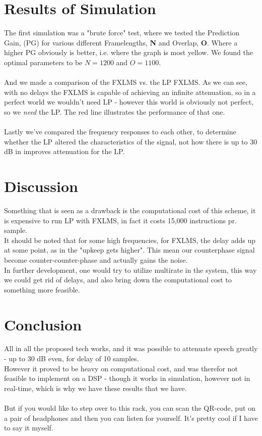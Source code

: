 \documentclass[12pt,a4paper,openright]{article}
\begin{document}
\section{Results of Simulation}
The first simulation was a "brute force" test, where we tested the Prediction Gain, (PG) for various different Framelengths, \textbf{N} and Overlap, \textbf{O}. Where a higher PG obviously is better, i.e. where the graph is most yellow.
We found the optimal parameters to be $N=1200$ and $O=1100$.\\\\
And we made a comparison of the FXLMS vs. the LP FXLMS. As we can see, with no delays the FXLMS is capable of achieving an infinite attenuation, so in a perfect world we wouldn't need LP - however this world is obviously not perfect, so we \textit{need} the LP. The red line illustrates the performance of that one.\\\\
Lastly we've compared the frequency responses to each other, to determine whether the LP altered the characteristics of the signal, not how there is up to 30 dB in improves attenuation for the LP.\\

\section{Discussion}
Something that is seen as a drawback is the computational cost of this scheme, it is expensive to run LP with FXLMS, in fact it costs 15,000 instructions pr. sample.\\ 
It should be noted that for some high frequencies, for FXLMS, the delay adds up at some point, as in the "upkeep gets higher". This mean our counterphase signal become counter-counter-phase and actually gains the noise. \\

In further development, one would try to utilize multirate in the system, this way we could get rid of delays, and also bring down the computational cost to something more feasible.


\section{Conclusion}
All in all the proposed tech works, and it was possible to attenuate speech greatly - up to 30 dB even, for delay of 10 samples.\\
However it proved to be heavy on computational cost, and was therefor not feasible to implement on a DSP - though it works in simulation, however not in real-time, which is why we have these results that we have.\\\\

But if you would like to step over to this rack, you can scan the QR-code, put on a pair of headphones and then you can listen for yourself. It's pretty cool if I have to say it myself.
\end{document}

